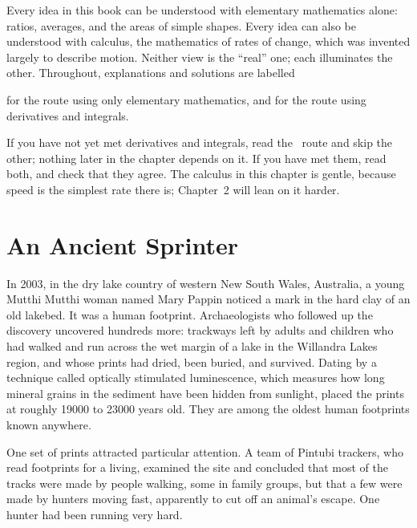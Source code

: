 \begin{tcolorbox}[enhanced,colback=slatepale,colframe=slate,sharp corners,boxrule=0.6pt,
  title=\textbf{How to read this chapter: two perspectives},coltitle=white,colbacktitle=slate,left=3mm,right=3mm]
Every idea in this book can be understood with elementary mathematics alone: ratios, averages, and the areas of simple shapes. Every idea can also be understood with calculus, the mathematics of rates of change, which was invented largely to describe motion. Neither view is the ``real'' one; each illuminates the other. Throughout, explanations and solutions are labelled
\begin{center}
\elemtag\quad for the route using only elementary mathematics, and \qquad \calctag\quad for the route using derivatives and integrals.
\end{center}
If you have not yet met derivatives and integrals, read the \elemtag\ route and skip the other; nothing later in the chapter depends on it. If you have met them, read both, and check that they agree. The calculus in this chapter is gentle, because speed is the simplest rate there is; Chapter~2 will lean on it harder.
\end{tcolorbox}

\section{An Ancient Sprinter}

In 2003, in the dry lake country of western New South Wales, Australia, a young Mutthi Mutthi woman named Mary Pappin noticed a mark in the hard clay of an old lakebed. It was a human footprint. Archaeologists who followed up the discovery uncovered hundreds more: trackways left by adults and children who had walked and run across the wet margin of a lake in the Willandra Lakes region, and whose prints had dried, been buried, and survived. Dating by a technique called optically stimulated luminescence, which measures how long mineral grains in the sediment have been hidden from sunlight, placed the prints at roughly \num{19000} to \num{23000} years old. They are among the oldest human footprints known anywhere.

One set of prints attracted particular attention. A team of Pintubi trackers, who read footprints for a living, examined the site and concluded that most of the tracks were made by people walking, some in family groups, but that a few were made by hunters moving fast, apparently to cut off an animal's escape. One hunter had been running very hard.

